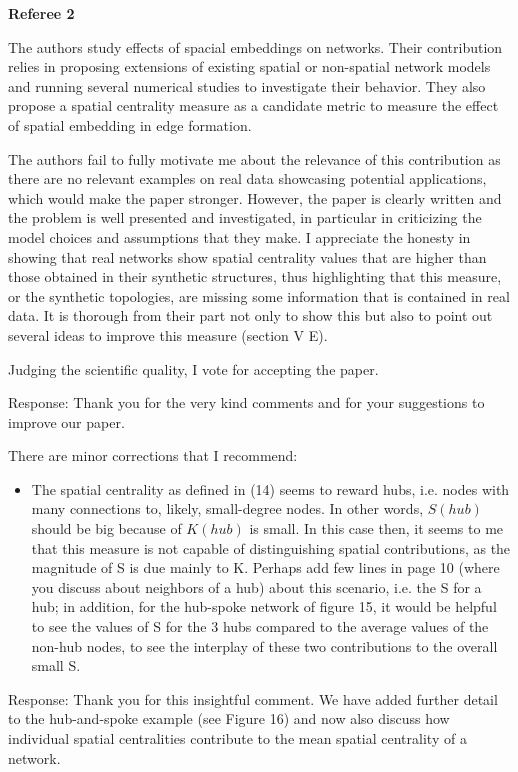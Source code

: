 \documentclass[12pt]{article}
\begin{document}
\pagebreak


\textbf{Referee 2}

The authors study effects of spacial embeddings on networks. Their contribution relies in
proposing extensions of existing spatial or non-spatial network models and running several
numerical studies to investigate their behavior. They also propose a spatial centrality
measure as a candidate metric to measure the effect of spatial embedding in edge formation.

The authors fail to fully motivate me about the relevance of this contribution as there are
no relevant examples on real data showcasing potential applications, which would make the
paper stronger. However, the paper is clearly written and the problem is well presented and
investigated, in particular in criticizing the model choices and assumptions that they make.
I appreciate the honesty in showing that real networks show spatial centrality values that are
higher than those obtained in their synthetic structures, thus highlighting that this measure,
or the synthetic topologies, are missing some information that is contained in real data. It is
thorough from their part not only to show this but also to point out several ideas to improve
this measure (section V E).

Judging the scientific quality, I vote for accepting the paper.

{\color{res} Response: Thank you for the very kind comments and for your suggestions to improve our paper. }

There are minor corrections that I recommend:

\begin{itemize}
\item The spatial centrality as defined in (14) seems to reward hubs, i.e. nodes with many
connections to, likely, small-degree nodes. In other words, $S(hub)$ should be big
because of $K(hub)$ is small. In this case then, it seems to me that this measure is not
capable of distinguishing spatial contributions, as the magnitude of S is due mainly
to K. Perhaps add few lines in page 10 (where you discuss about neighbors of a hub)
about this scenario, i.e. the S for a hub; in addition, for the hub-spoke network of
figure 15, it would be helpful to see the values of S for the 3 hubs compared to the
average values of the non-hub nodes, to see the interplay of these two contributions to
the overall small S.
\end{itemize}

{\color{res} Response: Thank you for this insightful comment. We have added further detail to the hub-and-spoke example (see Figure 16) and now also discuss how individual spatial centralities contribute to the mean spatial centrality of a network.}
\end{document}
